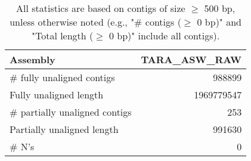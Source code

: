 \documentclass[12pt,a4paper]{article}
\begin{document}
\begin{table}[ht]
\begin{center}
\caption{All statistics are based on contigs of size $\geq$ 500 bp, unless otherwise noted (e.g., "\# contigs ($\geq$ 0 bp)" and "Total length ($\geq$ 0 bp)" include all contigs).}
\begin{tabular}{|l*{1}{|r}|}
\hline
Assembly & TARA\_ASW\_RAW \\ \hline
\# fully unaligned contigs & 988899 \\ \hline
Fully unaligned length & 1969779547 \\ \hline
\# partially unaligned contigs & 253 \\ \hline
Partially unaligned length & 991630 \\ \hline
\# N's & 0 \\ \hline
\end{tabular}
\end{center}
\end{table}
\end{document}
